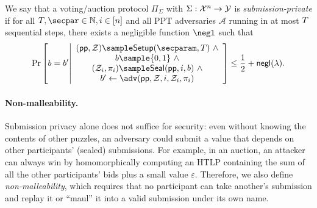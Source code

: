 \begin{definition}\label{def:submission_privacy}
We say that a voting/auction protocol $\Pi_\Sigma$ with $\Sigma: \mathcal{X}^n \to \mathcal{Y}$ is \emph{submission-private} if for all $\Ttime,\secpar \in \mathbb{N}, i \in [n]$ and all PPT adversaries $\mathcal{A}$ running in at most $T$ sequential steps, there exists a negligible function $\negl$ such that 
\begin{equation*}
    \Pr\left[
        b=b'
        \middle|
        \begin{array}{c}
            (\pparam, \Z) \sample \Setup(\secparam, \Ttime)~\land\\       
            b\sample\{0,1\}~\land\\
            (\Z_i, \pi_i) \sample \Seal(\pparam, i, b)~\land\\
            b'\gets\adv(\pparam,\Z,i, \Z_i, \pi_i)\\
        \end{array}
    \right]
    \leq \frac{1}{2} + \mathsf{negl}(\lambda).
\end{equation*}
\end{definition}

\paragraph{Non-malleability.} 
Submission privacy alone does not suffice for security: even without knowing the contents of other puzzles, an adversary could submit a value that depends on other participants' (sealed) submissions. For example, in an auction, an attacker can always win by homomorphically computing an HTLP containing the sum of all the other participants' bids plus a small value $\varepsilon$. Therefore, we also define \emph{non-malleability}, which requires that no participant can take another's submission and replay it or ``maul'' it into a valid submission under its own name.

